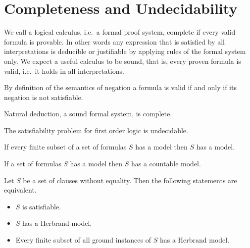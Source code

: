 

\chapter{Completeness and Undecidability}

	We call a logical calculus, i.e.~a formal proof system, {\myem complete} if every valid formula is provable.
	In other words any expression that is satisfied by all interpretations 
	is deducible or justifiable by applying rules of the formal system only.
	We expect a useful calculus to be {\myem sound}, that is, every proven formula is valid, 
	i.e.~it holds in all interpretations.

\begin{lemma}[Refutation]
	By definition of the semantics of negation a formula is valid if and only if its negation is not satisfiable.
\end{lemma}

\begin{theorem}
	Natural deduction, a sound formal system, is complete.
\end{theorem}

\begin{theorem}
	The satisfiability problem for first order logic is undecidable.
\end{theorem}










\begin{theorem}[Compactness]\label{the:compactness}
	If every finite subset of a set of formulas $S$ has a model then $S$ has a model. 
\end{theorem}

\begin{theorem}\label{the:loewenheim}
	If a set of formulas $S$ has a model then $S$ has a countable model.
\end{theorem}

\begin{theorem}[Herbrand]\label{the:herbrand}
	Let $S$ be a set of clauses without equality. Then the following statements are equivalent.
	\begin{itemize}
		\item $S$ is satisfiable.
		\item $S$ has a Herbrand model.
		\item Every finite subset of all ground instances of $S$ has a Herbrand model.
	\end{itemize} 
\end{theorem}

